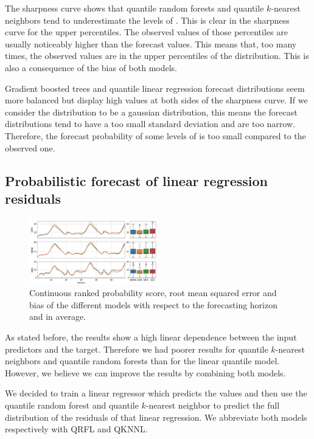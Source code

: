 \documentclass[a4paper,twocolumn,5p]{elsarticle}
\begin{document}
The sharpness curve shows that quantile random forests 
and quantile $k$-nearest
neighbors tend to underestimate the levels of
\no. This is clear in the sharpness curve for the
upper percentiles. The observed values of those percentiles are
usually noticeably higher than the forecast values. This means that,
too many times, the observed values are in the upper percentiles of
the distribution. This is also a consequence of the bias of both
models.

Gradient boosted trees and quantile linear regression forecast
distributions seem more balanced but display high values at both sides
of the sharpness curve.  If we consider the distribution to be a
gaussian distribution, this means the forecast distributions tend to
have a too small standard deviation and are too narrow. Therefore, the
forecast probability of some levels of \no is too
small compared to the observed one.

\subsection{Probabilistic forecast of linear regression residuals}

\begin{figure}[tbp]
  \centering
  \includegraphics[width=0.5\textwidth]{errorGraph_rfl_knnl}
  \caption{Continuous ranked probability score, root mean squared
    error and bias of the different models with respect to the
    forecasting horizon and in average.}
  \label{figure:errorGraph_rfl}
\end{figure}

As stated before, the results show a high linear dependence between
the input predictors and the target. Therefore we had poorer results
for quantile $k$-nearest neighbors and quantile random forests 
than for the linear
quantile model. However, we believe we can improve the results by
combining both models.

We decided to train a linear regressor which predicts the
\no values and then use the quantile random forest and quantile
$k$-nearest neighbor to predict the full distribution of the residuals
of that linear regression. We abbreviate both models respectively with
QRFL and QKNNL.
\end{document}
